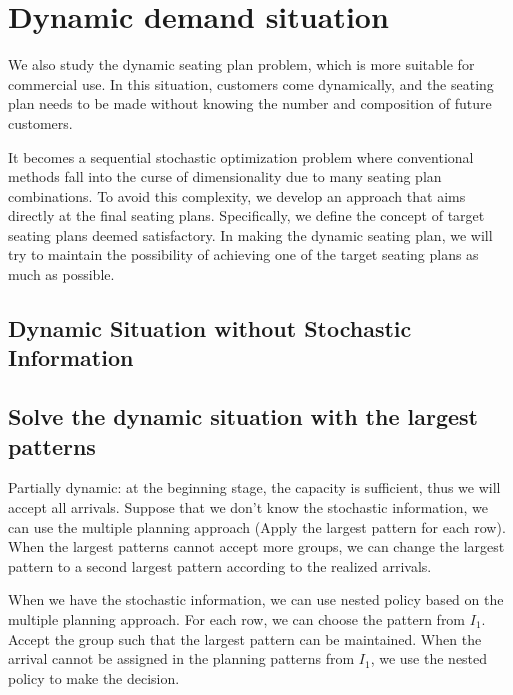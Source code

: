 \section{Dynamic demand situation}\label{dynamic_demand}

We also study the dynamic seating plan problem, which is more suitable for commercial use. In this situation, customers come dynamically, and the seating plan needs to be made without knowing the number and composition of future customers. 

It becomes a sequential stochastic optimization problem where conventional methods fall into the curse of dimensionality due to many seating plan combinations. To avoid this complexity, we develop an approach that aims directly at the final seating plans. Specifically, we define the concept of target seating plans deemed satisfactory. In making the dynamic seating plan, we will try to maintain the possibility of achieving one of the target seating plans as much as possible.

\subsection{Dynamic Situation without Stochastic Information}

\subsection{Solve the dynamic situation with the largest patterns}\label{largest_pattern}

Partially dynamic: at the beginning stage, the capacity is sufficient, thus we will accept all arrivals. Suppose that we don't know the stochastic information, we can use the multiple planning approach (Apply the largest pattern for each row). 
When the largest patterns cannot accept more groups, we can change the 
largest pattern to a second largest pattern according to the realized arrivals.



When we have the stochastic information, we can use nested policy based on the multiple planning approach. 
For each row, we can choose the pattern from $I_1$. Accept the group such that the largest pattern can be maintained. When the arrival cannot be assigned in the planning patterns from $I_1$, we use the nested policy to make the decision. 

